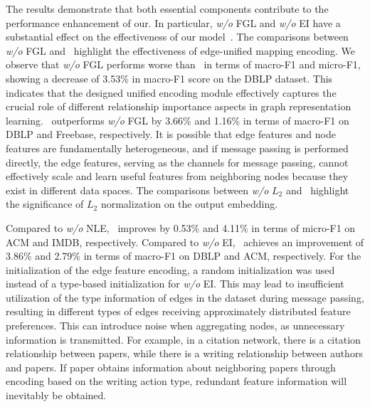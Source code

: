 The results demonstrate that both essential components contribute to the performance enhancement of our. 
In particular, \emph{w/o} FGL and \emph{w/o} EI have a substantial effect on the effectiveness of our model~\alg. 
The comparisons between \emph{w/o} FGL and \alg~highlight the effectiveness of edge-unified mapping encoding. 
%
We observe that \emph{w/o} FGL performs worse than \alg~in terms of macro-F1 and micro-F1, showing a decrease of 3.53\% in macro-F1 score on the DBLP dataset. 
%
This indicates that the designed unified encoding module effectively captures the crucial role of different relationship importance aspects in graph representation learning. 
%
\alg~outperforms \emph{w/o} FGL by 3.66\% and 1.16\% in terms of macro-F1 on DBLP and Freebase, respectively. 
It is possible that edge features and node features are fundamentally heterogeneous, and if message passing is performed directly, the edge features, serving as the channels for message passing, cannot effectively scale and learn useful features from neighboring nodes because they exist in different data spaces.
%
The comparisons between \emph{w/o} $L_{2}$ and \alg~highlight the significance of $L_{2}$ normalization on the output embedding. 




Compared to \emph{w/o} NLE, \alg~improves by 0.53\% and 4.11\% in terms of micro-F1 on ACM and IMDB, respectively. 
%
Compared to \emph{w/o} EI, \alg~achieves an improvement of 3.86\% and 2.79\% in terms of macro-F1 on DBLP and ACM, respectively. 
%
For the initialization of the edge feature encoding, a random initialization was used instead of a type-based initialization for \emph{w/o} EI. 
This may lead to insufficient utilization of the type information of edges in the dataset during message passing, resulting in different types of edges receiving approximately distributed feature preferences. 
This can introduce noise when aggregating nodes, as unnecessary information is transmitted. 
For example, in a citation network, there is a citation relationship between papers, while there is a writing relationship between authors and papers. 
If paper obtains information about neighboring papers through encoding based on the writing action type, redundant feature information will inevitably be obtained.


